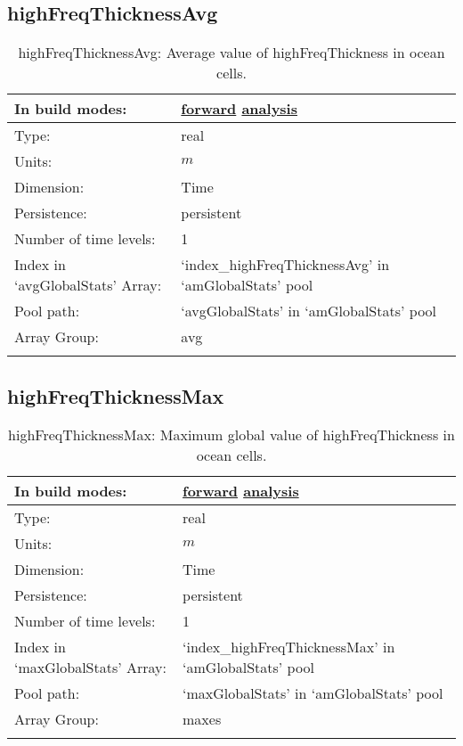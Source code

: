 \subsection[highFreqThicknessAvg]{highFreqThicknessAvg}
\label{subsec:var_sec_amGlobalStats_highFreqThicknessAvg}
\begin{center}
\begin{longtable}{| p{2.0in} | p{4.0in} |}
        \hline 
        In build modes: & \hyperref[subsec:forward_var_tab_amGlobalStats]{forward} \hyperref[subsec:analysis_var_tab_amGlobalStats]{analysis} \\
        \hline 
        Type: & real \\
        \hline 
        Units: & $m$ \\
        \hline 
        Dimension: & Time \\
        \hline 
        Persistence: & persistent \\
        \hline 
        Number of time levels: & 1 \\
        \hline 
		 Index in `avgGlobalStats' Array: & `index\_highFreqThicknessAvg' in `amGlobalStats' pool \\
		 \hline 
            Pool path: & `avgGlobalStats' in `amGlobalStats' pool \\
		 \hline 
		 Array Group: & avg \\
		 \hline 
    \caption{highFreqThicknessAvg: Average value of highFreqThickness in ocean cells.}
\end{longtable}
\end{center}
\subsection[highFreqThicknessMax]{highFreqThicknessMax}
\label{subsec:var_sec_amGlobalStats_highFreqThicknessMax}
\begin{center}
\begin{longtable}{| p{2.0in} | p{4.0in} |}
        \hline 
        In build modes: & \hyperref[subsec:forward_var_tab_amGlobalStats]{forward} \hyperref[subsec:analysis_var_tab_amGlobalStats]{analysis} \\
        \hline 
        Type: & real \\
        \hline 
        Units: & $m$ \\
        \hline 
        Dimension: & Time \\
        \hline 
        Persistence: & persistent \\
        \hline 
        Number of time levels: & 1 \\
        \hline 
		 Index in `maxGlobalStats' Array: & `index\_highFreqThicknessMax' in `amGlobalStats' pool \\
		 \hline 
            Pool path: & `maxGlobalStats' in `amGlobalStats' pool \\
		 \hline 
		 Array Group: & maxes \\
		 \hline 
    \caption{highFreqThicknessMax: Maximum global value of highFreqThickness in ocean cells.}
\end{longtable}
\end{center}
